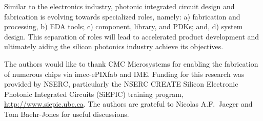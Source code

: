 \documentclass[journal]{spie}
\begin{document}
Similar to the electronics industry, photonic integrated circuit design and fabrication is evolving towards specialized roles, namely: a) fabrication and processing, b) EDA tools; c) component, library, and PDKs; and, d) system design.  This separation of roles will lead to accelerated product development and ultimately aiding the silicon photonics industry achieve its objectives. 



\acknowledgments

The authors would like to thank CMC Microsystems for enabling the fabrication of numerous chips via imec-ePIXfab and IME. 
Funding for this research was provided by NSERC, particularly the NSERC CREATE Silicon Electronic Photonic Integrated Circuits (SiEPIC) training program, \url{http://www.siepic.ubc.ca}.
The authors are grateful to Nicolas A.F.~Jaeger and Tom Baehr-Jones for useful discussions. 



\end{document}
